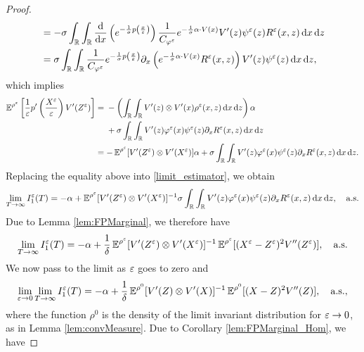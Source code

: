 \documentclass[10pt]{article}
\begin{document}
\begin{proof}
\begin{equation}
\begin{aligned}
	&= -\sigma \int_{\mathbb{R}} \int_{\mathbb{R}} \frac{\mathrm{d}}{\mathrm{d} x}\left( e^{ - \frac{1}{\sigma} p \left ( \frac{x}{\varepsilon} \right)} \right) \frac{1}{C_{\varphi^\varepsilon}} e^{- \frac{1}{\sigma} \alpha \cdot V(x)} V'(z) \psi^\varepsilon(z) R^\varepsilon(x,z) \,\mathrm{d} x \,\mathrm{d} z \\
	&= \sigma \int_{\mathbb{R}} \int_{\mathbb{R}} \frac{1}{C_{\varphi^\varepsilon}} e^{ - \frac{1}{\sigma} p \left ( \frac{x}{\varepsilon} \right)} \partial_x \left ( e^{- \frac{1}{\sigma} \alpha \cdot V(x)} R^\varepsilon(x,z) \right ) V'(z) \psi^\varepsilon(z) \,\mathrm{d} x \,\mathrm{d} z,
\end{aligned}
\end{equation}
which implies
\begin{align}
	\operatorname{\mathbb{E}}^{\rho^\varepsilon} \left [ \frac{1}{\varepsilon} p' \left ( \frac{X^\varepsilon}{\varepsilon} \right ) V'(Z^\varepsilon) \right ] &= 
	\begin{aligned}[t]
		&- \left(\int_{\mathbb{R}} \int_{\mathbb{R}} V'(z) \otimes V'(x) \rho^\varepsilon(x, z) \,\mathrm{d} x \,\mathrm{d} z\right) \alpha \\
		&+\sigma \int_{\mathbb{R}} \int_{\mathbb{R}} V'(z) \varphi^\varepsilon(x) \psi^\varepsilon(z) \partial_x R^\varepsilon(x,z) \,\mathrm{d} x \,\mathrm{d} z 
	\end{aligned}
	\\
	&= -  \operatorname{\mathbb{E}}^{\rho^\varepsilon} [ V'(Z^\varepsilon) \otimes V'(X^\varepsilon) ]\alpha + \sigma \int_{\mathbb{R}} \int_{\mathbb{R}} V'(z) \varphi^\varepsilon(x) \psi^\varepsilon(z) \partial_x R^\varepsilon(x,z) \,\mathrm{d} x \,\mathrm{d} z.
\end{align}
Replacing the equality above into \eqref{limit_estimator}, we obtain
\begin{equation}
\lim_{T \to \infty} I_1^\varepsilon(T) = -\alpha + \operatorname{\mathbb{E}}^{\rho^\varepsilon} [ V'(Z^\varepsilon) \otimes V'(X^\varepsilon) ]^{-1} \sigma \int_{\mathbb{R}} \int_{\mathbb{R}} V'(z) \varphi^\varepsilon(x) \psi^\varepsilon(z) \partial_x R^\varepsilon(x,z) \,\mathrm{d} x \,\mathrm{d} z, \quad \text{a.s.}
\end{equation}
Due to Lemma \ref{lem:FPMarginal}, we therefore have
\begin{equation} \label{eq:for_zeta}
	\lim_{T \to \infty} I_1^\varepsilon(T) = -\alpha + \frac1\delta \operatorname{\mathbb{E}}^{\rho^\varepsilon} [ V'(Z^\varepsilon) \otimes V'(X^\varepsilon) ]^{-1} \operatorname{\mathbb{E}}^{\rho^\varepsilon}[(X^\varepsilon - Z^\varepsilon)^2 V''(Z^\varepsilon)], \quad \text{a.s.}	
\end{equation}
We now pass to the limit as $\varepsilon$ goes to zero and
\begin{equation} \label{limit_estimator_2}
	\lim_{\varepsilon \to 0} \lim_{T \to \infty} I_1^\varepsilon(T) = -\alpha + \frac1\delta \operatorname{\mathbb{E}}^{\rho^0} [ V'(Z) \otimes V'(X) ]^{-1} \operatorname{\mathbb{E}}^{\rho^0}[(X - Z)^2 V''(Z)], \quad \text{a.s.},
\end{equation}
where the function $\rho^0$ is the density of the limit invariant distribution for $\varepsilon \to 0$, as in Lemma \ref{lem:convMeasure}. Due to Corollary \ref{lem:FPMarginal_Hom}, we have

\end{proof}
\end{document}

